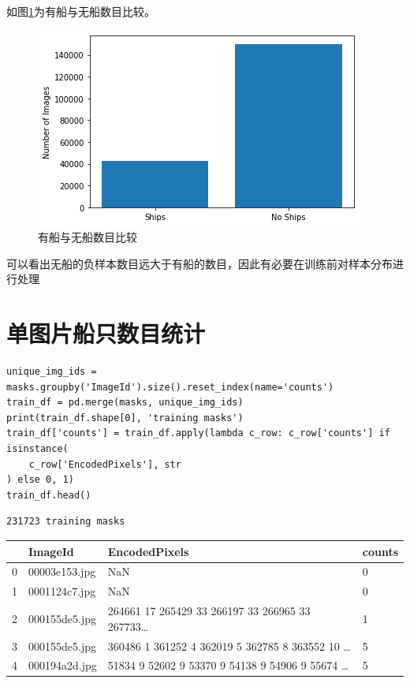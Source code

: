 如图\ref{fig::EDA8}为有船与无船数目比较。

\begin{figure}[htbp]
\centering
\includegraphics[width=0.8\linewidth]{body/EDA_pic/EDA_15_0}
\caption{有船与无船数目比较}
\label{fig::EDA8}
\end{figure}

可以看出无船的负样本数目远大于有船的数目，因此有必要在训练前对样本分布进行处理

\section{单图片船只数目统计}\label{ux5355ux56feux7247ux8239ux53eaux6570ux76eeux7edfux8ba1}

\begin{lstlisting}
unique_img_ids = masks.groupby('ImageId').size().reset_index(name='counts')
train_df = pd.merge(masks, unique_img_ids)
print(train_df.shape[0], 'training masks')
train_df['counts'] = train_df.apply(lambda c_row: c_row['counts'] if isinstance(
    c_row['EncodedPixels'], str
) else 0, 1)
train_df.head()
\end{lstlisting}

\begin{lstlisting}
231723 training masks
\end{lstlisting}

\begin{longtable}[]{@{}llll@{}}
\toprule
& ImageId & EncodedPixels & counts\tabularnewline
\midrule
\endhead
0 & 00003e153.jpg & NaN & 0\tabularnewline
1 & 0001124c7.jpg & NaN & 0\tabularnewline
2 & 000155de5.jpg & 264661 17 265429 33 266197 33 266965 33
267733\ldots{} & 1\tabularnewline
3 & 000155de5.jpg & 360486 1 361252 4 362019 5 362785 8 363552 10
\ldots{} & 5\tabularnewline
4 & 000194a2d.jpg & 51834 9 52602 9 53370 9 54138 9 54906 9 55674
\ldots{} & 5\tabularnewline
\bottomrule
\end{longtable}

